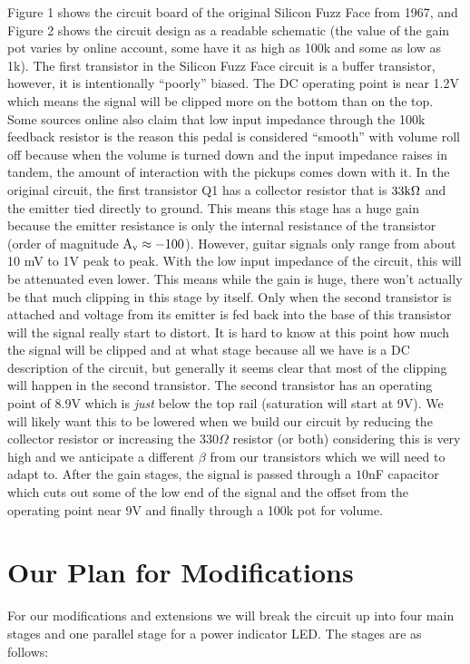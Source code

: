 \documentclass[%
reprint,
amsmath,amssymb,
aps,       
author-year 
]{revtex4-2}
\begin{document}
Figure 1 shows the circuit board of the original Silicon Fuzz Face from 1967, and Figure 2 shows the circuit design as a readable schematic (the value of the gain pot varies by online account, some have it as high as 100k and some as low as 1k). The first transistor in the Silicon Fuzz Face circuit is a buffer transistor, however, it is intentionally ``poorly'' biased. The DC operating point is near 1.2V which means the signal will be clipped more on the bottom than on the top. Some sources online also claim that low input impedance through the 100k feedback resistor is the reason this pedal is considered ``smooth'' with volume roll off because when the volume is turned down and the input impedance raises in tandem, the amount of interaction with the pickups comes down with it. In the original circuit, the first transistor Q1 has a collector resistor that is $\rm 33k\Omega$ and the emitter tied directly to ground. This means this stage has a huge gain because the emitter resistance is only the internal resistance of the transistor (order of magnitude $\rm A_v\approx -100$). However, guitar signals only range from about 10 mV to 1V peak to peak. With the low input impedance of the circuit, this will be attenuated even lower. This means while the gain is huge, there won't actually be that much clipping in this stage by itself. Only when the second transistor is attached and voltage from its emitter is fed back into the base of this transistor will the signal really start to distort. It is hard to know at this point how much the signal will be clipped and at what stage because all we have is a DC description of the circuit, but generally it seems clear that most of the clipping will happen in the second transistor. The second transistor has an operating point of 8.9V which is \textit{just} below the top rail (saturation will start at 9V). We will likely want this to be lowered when we build our circuit by reducing the collector resistor or increasing the 330$\Omega$ resistor (or both) considering this is very high and we anticipate a different $\beta$ from our transistors which we will need to adapt to. After the gain stages, the signal is passed through a $10$nF capacitor which cuts out some of the low end of the signal and the offset from the operating point near 9V and finally through a 100k pot for volume. 

\section{Our Plan for Modifications}
For our modifications and extensions we will break the circuit up into four main stages and one parallel stage for a power indicator LED. The stages are as follows:
\end{document}
